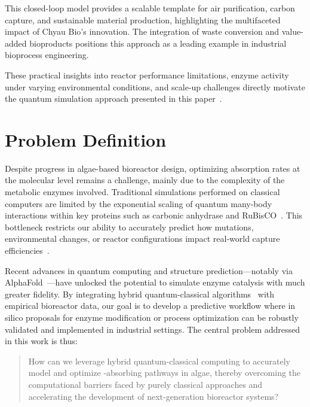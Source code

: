 \documentclass{article}
\begin{document}
This closed-loop model provides a scalable template for air purification, carbon capture, and sustainable material production, highlighting the multifaceted impact of Chyau Bio's innovation. The integration of waste conversion and value-added bioproducts positions this approach as a leading example in industrial bioprocess engineering.

These practical insights into reactor performance limitations, enzyme activity under varying environmental conditions, and scale-up challenges directly motivate the quantum simulation approach presented in this paper~\cite{chyaubio}.

\section{Problem Definition}
Despite progress in algae-based bioreactor design, optimizing  absorption rates at the molecular level remains a challenge, mainly due to the complexity of the metabolic enzymes involved. Traditional simulations performed on classical computers are limited by the exponential scaling of quantum many-body interactions within key proteins such as carbonic anhydrase and RuBisCO~\cite{kais2024,mcardle2020}. This bottleneck restricts our ability to accurately predict how mutations, environmental changes, or reactor configurations impact real-world capture efficiencies~\cite{chyaubio}.

Recent advances in quantum computing and structure prediction---notably via AlphaFold~\cite{alphafold_nature,alphafold_db,alphafold_embl}---have unlocked the potential to simulate enzyme catalysis with much greater fidelity. By integrating hybrid quantum-classical algorithms~\cite{cao2019,babbush2022,bravyi2002} with empirical bioreactor data, our goal is to develop a predictive workflow where in silico proposals for enzyme modification or process optimization can be robustly validated and implemented in industrial settings. The central problem addressed in this work is thus: 

\begin{quote}
How can we leverage hybrid quantum-classical computing to accurately model and optimize -absorbing pathways in algae, thereby overcoming the computational barriers faced by purely classical approaches and accelerating the development of next-generation bioreactor systems?
\end{quote}
\end{document}
